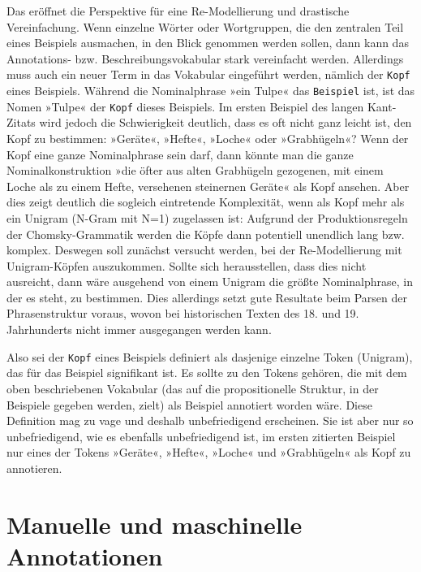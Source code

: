 \documentclass{article}
\newcommand*{\vokabular}{\texttt}%
\begin{document}
Das eröffnet die Perspektive für eine Re-Modellierung und drastische
Vereinfachung. Wenn einzelne Wörter oder Wortgruppen, die den
zentralen Teil eines Beispiels ausmachen, in den Blick genommen werden
sollen, dann kann das Annotations- bzw. Beschreibungsvokabular stark
vereinfacht werden. Allerdings muss auch ein neuer Term in das
Vokabular eingeführt werden, nämlich der \vokabular{Kopf} eines
Beispiels. Während die Nominalphrase »ein Tulpe« das
\vokabular{Beispiel} ist, ist das Nomen »Tulpe« der \vokabular{Kopf}
dieses Beispiels. Im ersten Beispiel des langen Kant-Zitats wird
jedoch die Schwierigkeit deutlich, dass es oft nicht ganz leicht ist,
den Kopf zu bestimmen: »Geräte«, »Hefte«, »Loche« oder »Grabhügeln«?
Wenn der Kopf eine ganze Nominalphrase sein darf, dann könnte man die
ganze Nominalkonstruktion »die öfter aus alten Grabhügeln gezogenen,
mit einem Loche als zu einem Hefte, versehenen steinernen Geräte« als
Kopf ansehen. Aber dies zeigt deutlich die sogleich eintretende
Komplexität, wenn als Kopf mehr als ein Unigram (N-Gram mit N=1)
zugelassen ist: Aufgrund der Produktionsregeln der Chomsky-Grammatik werden
die Köpfe dann potentiell unendlich lang bzw. komplex. Deswegen soll
zunächst versucht werden, bei der Re-Modellierung mit Unigram-Köpfen
auszukommen. Sollte sich herausstellen, dass dies nicht ausreicht,
dann wäre ausgehend von einem Unigram die größte Nominalphrase, in der
es steht, zu bestimmen. Dies allerdings setzt gute Resultate beim
Parsen der Phrasenstruktur voraus, wovon bei historischen Texten des
18. und 19. Jahrhunderts nicht immer ausgegangen werden kann.

Also sei der \vokabular{Kopf} eines Beispiels definiert als dasjenige
einzelne Token (Unigram), das für das Beispiel signifikant ist. Es
sollte zu den Tokens gehören, die mit dem oben beschriebenen Vokabular
(das auf die propositionelle Struktur, in der Beispiele gegeben
werden, zielt) als Beispiel annotiert worden wäre. Diese Definition
mag zu vage und deshalb unbefriedigend erscheinen. Sie ist aber nur so
unbefriedigend, wie es ebenfalls unbefriedigend ist, im ersten
zitierten Beispiel nur eines der Tokens »Geräte«, »Hefte«, »Loche« und
»Grabhügeln« als Kopf zu annotieren.


\section{Manuelle und maschinelle Annotationen}
\end{document}
